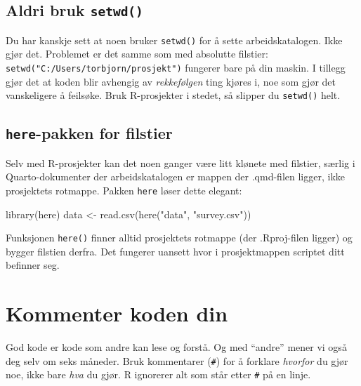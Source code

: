 \documentclass[
  norsk,
  letterpaper,
  DIV=11,
  numbers=noendperiod]{scrreprt}
\newenvironment{Shaded}{\begin{snugshade}}{\end{snugshade}}
\newcommand{\FunctionTok}[1]{\textcolor[rgb]{0.28,0.35,0.67}{#1}}
\newcommand{\NormalTok}[1]{\textcolor[rgb]{0.00,0.23,0.31}{#1}}
\newcommand{\OtherTok}[1]{\textcolor[rgb]{0.00,0.23,0.31}{#1}}
\newcommand{\StringTok}[1]{\textcolor[rgb]{0.13,0.47,0.30}{#1}}
\theoremstyle{definition}
\theoremstyle{remark}
\begin{document}
\subsection{\texorpdfstring{Aldri bruk
\texttt{setwd()}}{Aldri bruk setwd()}}\label{aldri-bruk-setwd}

Du har kanskje sett at noen bruker \texttt{setwd()} for å sette
arbeidskatalogen. Ikke gjør det. Problemet er det samme som med
absolutte filstier: \texttt{setwd("C:/Users/torbjorn/prosjekt")}
fungerer bare på din maskin. I tillegg gjør det at koden blir avhengig
av \emph{rekkefølgen} ting kjøres i, noe som gjør det vanskeligere å
feilsøke. Bruk R-prosjekter i stedet, så slipper du \texttt{setwd()}
helt.

\subsection{\texorpdfstring{\texttt{here}-pakken for
filstier}{here-pakken for filstier}}\label{here-pakken-for-filstier}

Selv med R-prosjekter kan det noen ganger være litt klønete med
filstier, særlig i Quarto-dokumenter der arbeidskatalogen er mappen der
.qmd-filen ligger, ikke prosjektets rotmappe. Pakken \texttt{here} løser
dette elegant:

\begin{Shaded}
\begin{Highlighting}[]
\FunctionTok{library}\NormalTok{(here)}
\NormalTok{data }\OtherTok{\textless{}{-}} \FunctionTok{read.csv}\NormalTok{(}\FunctionTok{here}\NormalTok{(}\StringTok{"data"}\NormalTok{, }\StringTok{"survey.csv"}\NormalTok{))}
\end{Highlighting}
\end{Shaded}

Funksjonen \texttt{here()} finner alltid prosjektets rotmappe (der
.Rproj-filen ligger) og bygger filstien derfra. Det fungerer uansett
hvor i prosjektmappen scriptet ditt befinner seg.

\section{Kommenter koden din}\label{kommenter-koden-din}

God kode er kode som andre kan lese og forstå. Og med ``andre'' mener vi
også deg selv om seks måneder. Bruk kommentarer (\texttt{\#}) for å
forklare \emph{hvorfor} du gjør noe, ikke bare \emph{hva} du gjør. R
ignorerer alt som står etter \texttt{\#} på en linje.
\end{document}
